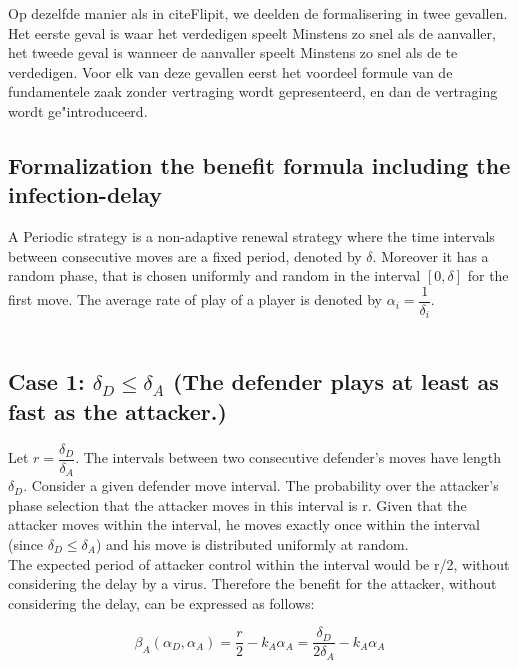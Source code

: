 \documentclass[master=cws, masteroption=vs]{kulemt}
\begin{document}
\begin{abstract*}
Op dezelfde manier als in cite{}Flipit, we deelden de formalisering in twee gevallen. Het eerste geval is waar het verdedigen speelt Minstens zo snel als de aanvaller, het tweede geval is wanneer de aanvaller speelt Minstens zo snel als de te verdedigen. Voor elk van deze gevallen eerst het voordeel formule van de fundamentele zaak zonder vertraging wordt gepresenteerd, en dan de vertraging wordt ge"introduceerd. \\

\subsection{Formalization the benefit formula including the infection-delay}
 A Periodic strategy is a non-adaptive renewal strategy where the time intervals between consecutive moves are a fixed period, denoted by $\delta$. Moreover it has a random phase, that is chosen uniformly and random in the interval $[0,\delta]$ for the first move. The average rate of play of a player is denoted by $\alpha_{i} = \dfrac{1}{\delta_{i}}$. \\
~~\\

\subsection*{\textbf{Case 1:} $\delta_{D} \leq \delta_{A} $ (The defender plays at least as fast as the attacker.) }

Let $r = \dfrac{\delta_{D}}{ \delta_{A} }$. The intervals between two consecutive defender's moves have length $\delta_{D}$. Consider a given defender move interval. The probability over the attacker's phase selection that the attacker moves in this interval is r. Given that the attacker moves within the interval, he moves exactly once within the interval (since $\delta_{D} \leq \delta_{A} $) and his move is distributed uniformly at random. \\

The expected period of attacker control within the interval would be r/2, without considering the delay by a virus. Therefore the benefit for the attacker, without considering the delay, can be expressed as follows:

\begin{equation}\label{first}
\beta_{A}(\alpha_{D},\alpha_{A}) =\dfrac {r} {2} - k_{A} \alpha_{A} = \dfrac {\delta_{D}} {2\delta_{A}} - k_{A} \alpha_{A}  
\end{equation}\\


\end{abstract*}
\end{document}
